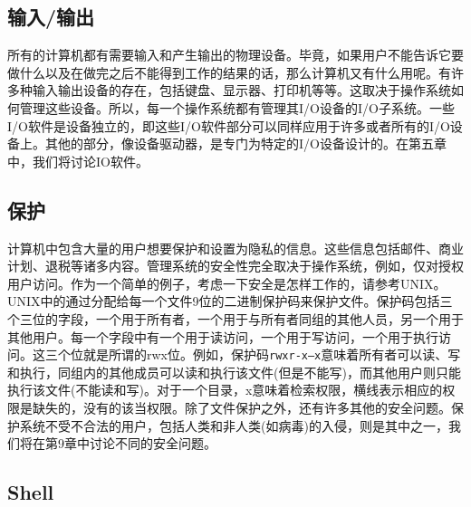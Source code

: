 	\subsection{输入/输出}
	
	所有的计算机都有需要输入和产生输出的物理设备。毕竟，如果用户不能告诉它要做什么以及在做完之后不能得到工作的结果的话，那么计算机又有什么用呢。有许多种输入输出设备的存在，包括键盘、显示器、打印机等等。这取决于操作系统如何管理这些设备。所以，每一个操作系统都有管理其I/O设备的I/O子系统。一些I/O软件是设备独立的，即这些I/O软件部分可以同样应用于许多或者所有的I/O设备上。其他的部分，像设备驱动器，是专门为特定的I/O设备设计的。在第五章中，我们将讨论IO软件。
	
	\subsection{保护}
	
	计算机中包含大量的用户想要保护和设置为隐私的信息。这些信息包括邮件、商业计划、退税等诸多内容。管理系统的安全性完全取决于操作系统，例如，仅对授权用户访问。作为一个简单的例子，考虑一下安全是怎样工作的，请参考UNIX。UNIX中的通过分配给每一个文件9位的二进制保护码来保护文件。保护码包括三个三位的字段，一个用于所有者，一个用于与所有者同组的其他人员，另一个用于其他用户。每一个字段中有一个用于读访问，一个用于写访问，一个用于执行访问。这三个位就是所谓的rwx位。例如，保护码\texttt{rwxr-x--x}意味着所有者可以读、写和执行，同组内的其他成员可以读和执行该文件(但是不能写)，而其他用户则只能执行该文件(不能读和写)。对于一个目录，x意味着检索权限，横线表示相应的权限是缺失的，没有的该当权限。除了文件保护之外，还有许多其他的安全问题。保护系统不受不合法的用户，包括人类和非人类(如病毒)的入侵，则是其中之一，我们将在第9章中讨论不同的安全问题。
	
	\subsection{Shell}
	
